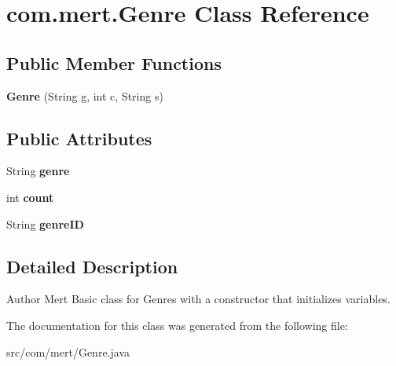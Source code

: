 \hypertarget{classcom_1_1mert_1_1_genre}{}\section{com.\+mert.\+Genre Class Reference}
\label{classcom_1_1mert_1_1_genre}
\subsection*{Public Member Functions}
\begin{DoxyCompactItemize}
\item 
{\bfseries Genre} (String g, int c, String s)\hypertarget{classcom_1_1mert_1_1_genre_a247670a122cc46ad67d18c5e95bc616f}{}\label{classcom_1_1mert_1_1_genre_a247670a122cc46ad67d18c5e95bc616f}

\end{DoxyCompactItemize}
\subsection*{Public Attributes}
\begin{DoxyCompactItemize}
\item 
String {\bfseries genre}\hypertarget{classcom_1_1mert_1_1_genre_ac817edf5f6e25cd272056d2c7e1f4a48}{}\label{classcom_1_1mert_1_1_genre_ac817edf5f6e25cd272056d2c7e1f4a48}

\item 
int {\bfseries count}\hypertarget{classcom_1_1mert_1_1_genre_a170c42905554ae425fe43c6f21548374}{}\label{classcom_1_1mert_1_1_genre_a170c42905554ae425fe43c6f21548374}

\item 
String {\bfseries genre\+ID}\hypertarget{classcom_1_1mert_1_1_genre_af124bc3ed8ba6ae918f0c0efe22e7b5d}{}\label{classcom_1_1mert_1_1_genre_af124bc3ed8ba6ae918f0c0efe22e7b5d}

\end{DoxyCompactItemize}


\subsection{Detailed Description}
\begin{DoxyAuthor}{Author}
Mert Basic class for Genres with a constructor that initializes variables. 
\end{DoxyAuthor}


The documentation for this class was generated from the following file\+:\begin{DoxyCompactItemize}
\item 
src/com/mert/Genre.\+java\end{DoxyCompactItemize}
